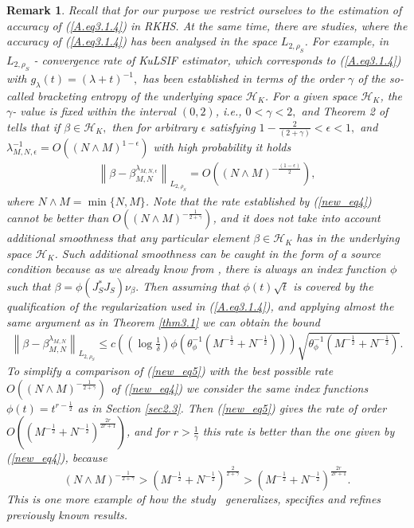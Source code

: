 \documentclass[USenglish]{article}
\newcommand{\norm}[1]{\left\lVert#1\right\rVert}
\newtheorem{remark}{Remark}
\begin{document}
\begin{remark}\label{rem_new3}
	Recall that for our purpose we restrict ourselves to the estimation of accuracy of (\ref{A.eq3.1.4}) in RKHS. At the same time, there are studies, where the accuracy of (\ref{A.eq3.1.4}) has been analysed in the space $ L_{2,\rho_S} $. For example, in \cite{kanamori2012} $ L_{2,\rho_S} $ - convergence rate of KuLSIF estimator, which corresponds to (\ref{A.eq3.1.4}) with $ g_\lambda (t) = (\lambda + t)^{-1}, $ has been established in terms of the order $ \gamma $ of the so-called bracketing entropy of the underlying space $ \mathcal{H}_K $. For a given space $ \mathcal{H}_K $, the $ \gamma $- value is fixed within the interval $ (0,2) $, i.e., $ 0<\gamma<2, $ and Theorem 2 of \cite{kanamori2012} tells that if $ \beta \in \mathcal{H}_K,  $ then for arbitrary $ \epsilon $ satisfying $ 1 - \frac{2}{(2+\gamma)} < \epsilon < 1,$ and $ \lambda_{M,N,\epsilon}^{-1} = O \left( (N \wedge M)^{1-\epsilon}\right) $ with high probability it holds 
	\begin{align}\label{new_eq4}
	\norm{\beta - \beta_{M,N}^{\lambda_{M,N,\epsilon}}}_{L_{2,\rho_S}} = O \left( (N \wedge M)^{- \frac{(1-\epsilon)}{2}}\right), 
	\end{align}
	where $ N \wedge M = \min \{N,M\} $. Note that the rate established by (\ref{new_eq4}) cannot be better than $ O\left( (N \wedge M)^{- \frac{1}{2 + \gamma}} \right) $, and it does not take into account additional smoothness that any particular element $ \beta \in \mathcal{H}_K $ has in the underlying space $\mathcal{H}_K $. Such additional smoothness can be caught in the form of a source condition because as we already know from \cite{mathe2008}, there is always an index function $ \phi $ such that $ \beta = \phi (J_S^*J_S) \nu_\beta. $ Then assuming that $ \phi (t) \sqrt{t} $ is covered by the qualification of the regularization used in (\ref{A.eq3.1.4}), %
 and applying almost the same argument as in Theorem \ref{thm3.1} we can obtain the bound 
	\begin{align}\label{new_eq5}
	\norm{\beta - \beta_{M,N}^{\lambda_{M,N}}}_{L_{2,\rho_S}} \leq c \left( \left( \log \frac{1}{\delta}  \right) \phi \left( \theta_\phi^{-1} (M^{-\frac{1}{2}} + N^{-\frac{1}{2}})\right) \right) \sqrt{\theta_\phi^{-1} (M^{-\frac{1}{2}} + N^{-\frac{1}{2}})}.
	\end{align}
	To simplify a comparison of (\ref{new_eq5}) with the best possible rate $ O \left( (N \wedge M)^{- \frac{1}{2 + \gamma}} \right) $ of (\ref{new_eq4}) we consider the same index functions $ \phi (t) = t^{r - \frac{1}{2}} $ as in Section \ref{sec2.3}. Then (\ref{new_eq5}) gives the rate of order $ O \left( (M^{-\frac{1}{2}} + N^{-\frac{1}{2}})^{\frac{2r}{2r+1}} \right) $, and for $ r > \frac{1}{\gamma} $ this rate is better than the one given by (\ref{new_eq4}), because 
	$$(N \wedge M)^{- \frac{1}{2 + \gamma}}  > (M^{-\frac{1}{2}} + N^{-\frac{1}{2}})^{\frac{2}{2+\gamma}}  > (M^{-\frac{1}{2}} + N^{-\frac{1}{2}})^{\frac{2r}{2r+1}}. $$
	This is one more example of how the study~\cite{gizewski2022regularization} generalizes, specifies and refines previously known results.
\end{remark}
\end{document}
